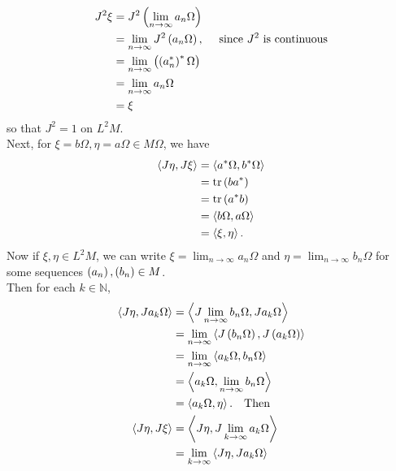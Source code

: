 \documentclass[a4paper,10pt]{report}
\begin{document}
\begin{enumerate}
\begin{enumerate}
\begin{align*}
                    J^2 \xi%
                    &= J^2 \E \lim_{n \to \infty} a_n \Omega \R\\
                    &= \lim_{n \to \infty} J^2 \E a_n \Omega \R, \quad \te{ since $J^2$ is continuous}\\
                    &= \lim_{n \to \infty} \E \E a_n^* \R^* \Omega \R\\
                    &= \lim_{n \to \infty} a_n \Omega\\
                    &= \xi
                  \end{align*}
                  so that $J^2 = 1$ on $L^2 M$.\\
                  Next, for $\xi = b \Omega , \eta = a \Omega \in M \Omega$, we have
                  \begin{align*}
                    \ET J \eta , J \xi \TE%
                    &= \ET a^* \Omega , b^* \Omega\TE\\
                    &= \tr \E b a^* \R\\
                    &= \tr \E a^* b \R\\
                    &= \ET b \Omega , a \Omega \TE\\
                    &= \ET \xi , \eta \TE.
                  \end{align*}
                  Now if $\xi , \eta \in L^2 M$, we can write $\xi = \lim_{n \to \infty} a_n \Omega$ and $\eta = \lim_{n \to \infty} b_n \Omega$ for some sequences $\left( a_n \right) , \left( b_n \right) \in M$.\\
                  Then for each $k \in \mathbb N$,
                  \begin{align*}
                    \ET J \eta , J a_k \Omega \TE%
                    &= \ET J \lim_{n \to \infty} b_n \Omega , J a_k \Omega \TE\\
                    &= \lim_{n \to \infty} \ET J \E b_n \Omega \R , J \E a_k \Omega \R \TE\\
                    &= \lim_{n \to \infty} \ET a_k \Omega , b_n \Omega \TE\\
                    &= \ET a_k \Omega , \lim_{n \to \infty} b_n \Omega \TE\\
                    &= \ET a_k \Omega , \eta \TE.  \quad \text{Then}\\
                    \ET J \eta , J \xi \TE%
                    &= \ET J \eta , J \lim_{k \to \infty} a_k \Omega \TE\\
                    &= \lim_{k \to \infty} \ET J \eta , J a_k \Omega \TE\\

\end{align*}
\end{enumerate}
\end{enumerate}
\end{document}

